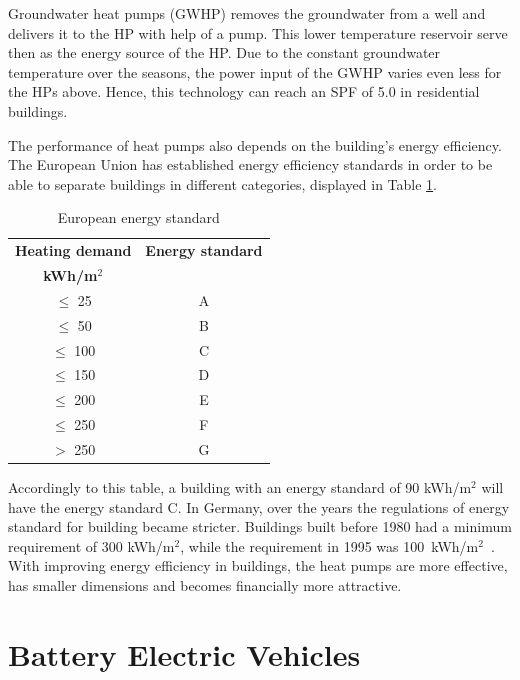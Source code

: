 Groundwater heat pumps (GWHP) removes the groundwater from a well and delivers it to the HP with help of a pump. This lower temperature reservoir serve then as the energy source of the HP. Due to the constant groundwater temperature over the seasons, the power input of the GWHP varies even less for the HPs above. %
Hence, this technology can reach an SPF of 5.0 in residential buildings. %

The performance of heat pumps also depends on the building's energy efficiency. The European Union has established energy efficiency standards in order to be able to separate buildings in different categories, displayed in Table \ref{tab:kfw}.

\begin{table}[!ht]
    \centering
    \caption{European energy standard}
    \begin{tabular}{c|c}
        \textbf{Heating demand} & \textbf{Energy standard} \\
        \textbf{kWh/m$^2$} & \\
        \hline\hline
        $\leq$ 25 & A \\ 
        $\leq$ 50 & B \\ 
        $\leq$ 100 & C \\ 
        $\leq$ 150 & D \\ 
        $\leq$ 200 & E \\ 
        $\leq$ 250 & F \\ 
        $>$ 250 & G \\ \hline
    \end{tabular}
    \label{tab:kfw}
\end{table}

Accordingly to this table, a building with an energy standard of 90 kWh/m$^2$ will have the energy standard C. In Germany, over the years the regulations of energy standard for building became stricter. Buildings built before 1980 had a minimum requirement of 300 kWh/m$^2$, while the requirement in 1995 was 100~kWh/m$^2$~\cite{Bundesregierung_1994}. With improving energy efficiency in buildings, the heat pumps are more effective, has smaller dimensions and becomes financially more attractive. 



\section{Battery Electric Vehicles}

